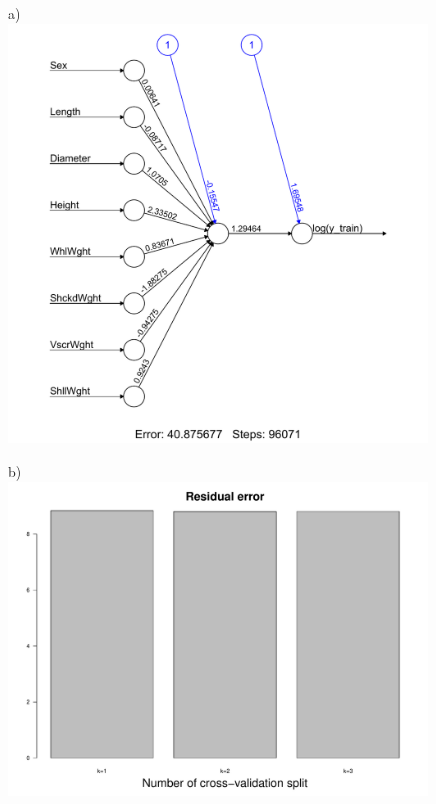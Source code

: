 \documentclass[10pt, paper=a4]{article}
\begin{document}
\begin{figure}[h]
  \centering
  \begin{minipage}{0.3\textwidth}
    a)\\
    \includegraphics[width = 0.99\textwidth]{ANN_LR.pdf}
  \end{minipage} \hfill
  \begin{minipage}{0.3\textwidth}
    b)\\
    \includegraphics[width = 0.99\textwidth]{ANN_LR_Error.pdf}

\end{minipage}
\end{figure}
\end{document}
